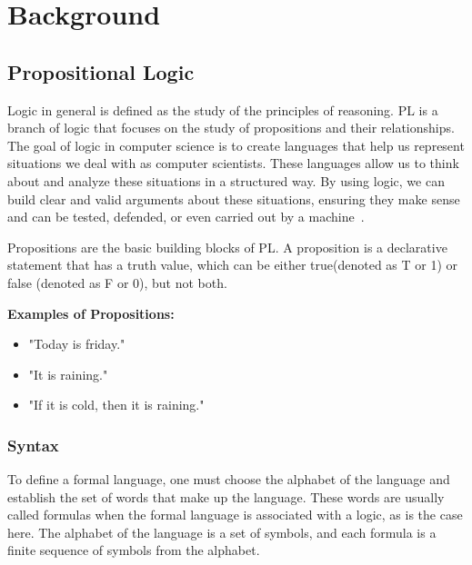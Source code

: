 
%

\chapter{Background}

\section{Propositional Logic}
\label{chap:prop}
Logic in general is defined as the study of the principles of reasoning. \gls{PL} is a branch of logic that focuses on the study of propositions and their relationships. The goal of logic in computer science is to create languages that help us represent situations we deal with as computer scientists. These languages allow us to think about and analyze these situations in a structured way. By using logic, we can build clear and valid arguments about these situations, ensuring they make sense and can be tested, defended, or even carried out by a machine~\cite{huth_2004_logic}.

Propositions are the basic building blocks of \gls{PL}. A proposition is a declarative statement that has a truth value, which can be either true(denoted as T or 1) or false (denoted as F or 0), but not both.

\textbf{Examples of Propositions:}
\begin{itemize}
    \item "Today is friday."
    \item "It is raining."
    \item "If it is cold, then it is raining."
\end{itemize}

\subsection{Syntax}
\label{chap:prop-syntax}
To define a formal language, one must choose the alphabet of the language and establish the set of words that make up the language. These words are usually called formulas when the formal language is associated with a logic, as is the case here. The alphabet of the language is a set of symbols, and each formula is a finite sequence of symbols from the alphabet.


